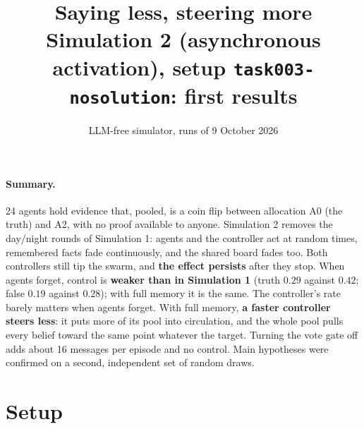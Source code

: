 \documentclass[10pt,a4paper]{article}
\title{\vspace{-1.2cm}\textbf{Saying less, steering more}\\[2pt]
\large Simulation 2 (asynchronous activation), setup \texttt{task003-nosolution}: first results}
\author{LLM-free simulator, runs of 9 October 2026}
\date{}
\begin{document}
\maketitle
\vspace{-1cm}

\paragraph{Summary.} 24 agents hold evidence that, pooled, is a coin flip between allocation
A0 (the truth) and A2, with no proof available to anyone. Simulation 2 removes the day/night
rounds of Simulation 1: agents and the controller act at random times, remembered facts fade
continuously, and the shared board fades too. Both controllers still tip the swarm, and
\textbf{the effect persists} after they stop. When agents forget, control is
\textbf{weaker than in Simulation 1} (truth $0.29$ against $0.42$; false $0.19$ against
$0.28$); with full memory it is the same. The controller's rate barely matters when agents
forget. With full memory, \textbf{a faster controller steers less}: it puts more of its pool
into circulation, and the whole pool pulls every belief toward the same point whatever the
target. Turning the vote gate off adds about 16 messages per episode and no control.
Main hypotheses were confirmed on a second, independent set of random draws.

\section{Setup}
\end{document}
